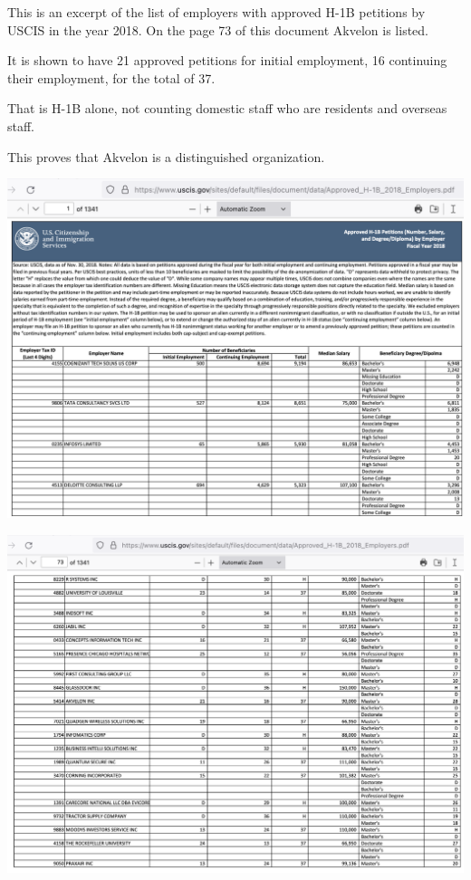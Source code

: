 
This is an excerpt of the list of employers with approved H-1B petitions by USCIS in the year 2018.
On the page 73 of this document Akvelon is listed.

It is shown to have 21 approved petitions for initial employment,
16 continuing their employment, for the total of 37.

That is H-1B alone, not counting domestic staff who are residents and overseas staff.

This proves that Akvelon is a distinguished organization.

\includegraphics[width=\textwidth]{akvelon-uscis-approved-p1}
\WillContinue
\pagebreak

\Continuing
\includegraphics[width=\textwidth]{akvelon-uscis-approved-p73}

\pagebreak
